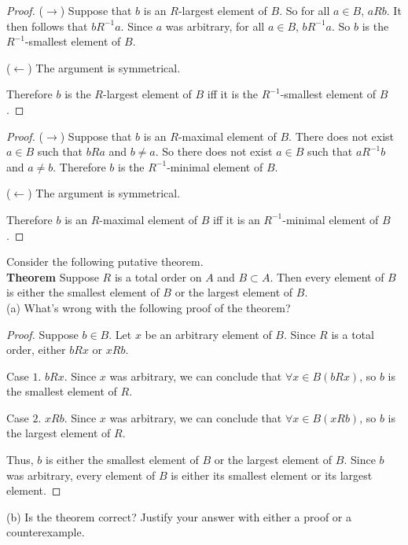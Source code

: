 \begin{proof}
    ($\rightarrow$) Suppose that $b$ is an $R$-largest element of $B$.
    So for all $a \in B$, $aRb$. 
    It then follows that $bR^{-1}a$.
    Since $a$ was arbitrary, for all $a \in B$, $bR^{-1}a$. 
    So $b$ is the $R^{-1}$-smallest element of $B$.

    ($\leftarrow$) The argument is symmetrical.

    Therefore $b$ is the $R$-largest element of $B$ iff it is the $R^{-1}$-smallest
        element of $B$.
\end{proof}

\begin{proof}
    ($\rightarrow$) Suppose that $b$ is an $R$-maximal element of $B$.
    There does not exist $a \in B$ such that $bRa$ and $b \not= a$.
    So there does not exist $a \in B$ such that $aR^{-1}b$ and $a \not= b$.
    Therefore $b$ is the $R^{-1}$-minimal element of $B$.

    ($\leftarrow$) The argument is symmetrical.

    Therefore $b$ is an $R$-maximal element of $B$ iff it is an $R^{-1}$-minimal 
        element of $B$.
\end{proof}

\begin{tcolorbox}[title=Problem 19, breakable]
    Consider the following putative theorem. \\

    \textbf{Theorem} Suppose $R$ is a total order on $A$ and $B \subset A$.
    Then every element of $B$ is either the smallest element of $B$
    or the largest element of $B$. \\

    (a) What's wrong with the following proof of the theorem? \\
    \begin{proof}
        Suppose $b \in B$. Let $x$ be an arbitrary element of $B$.
        Since $R$ is a total order, either $bRx$ or $xRb$.

        Case $1$. $bRx$. Since $x$ was arbitrary, we can conclude that 
        $\forall{x} \in B(bRx)$, so $b$ is the smallest element of $R$.

        Case $2$. $xRb$. Since $x$ was arbitrary, we can conclude that 
        $\forall{x} \in B(xRb)$, so $b$ is the largest element of $R$.

        Thus, $b$ is either the smallest element of $B$ or the largest element 
        of $B$. Since $b$ was arbitrary, every element of $B$ is either its 
        smallest element or its largest element.
    \end{proof}

    (b) Is the theorem correct? Justify your answer with either a proof 
        or a counterexample.
\end{tcolorbox}

